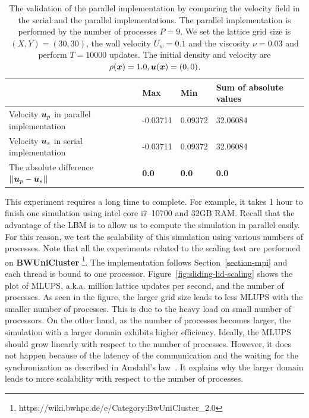 \begin{table}
  \begin{center}
    \caption{The validation of the parallel implementation by comparing
    the velocity field in the serial and the parallel implementations.
    The parallel implementation is performed by the number of processes $P = 9$.
    We set the lattice grid size is $(X, Y) = (30, 30)$,
    the wall velocity $U_w = 0.1$ and the viscosity $\nu = 0.03$
    and perform $T = 10000$ updates.
    The initial density and velocity are $\rho(\boldsymbol{x}) = 1.0, \boldsymbol{u}(\boldsymbol{x}) = (0, 0)$.
    }
    \vspace{2mm}
    \label{tab:parallel-validation}
    \begin{tabular}{llll}
      \toprule
       & Max & Min & Sum of absolute values \\
      \midrule
      Velocity $\boldsymbol{u}_p$ in parallel implementation & -0.03711 & 0.09372 & 32.06084 \\
      Velocity $\boldsymbol{u}_s$ in serial implementation & -0.03711 & 0.09372 & 32.06084 \\
      The absolute difference $|| \boldsymbol{u}_p - \boldsymbol{u}_s ||$ & {\bf 0.0} & {\bf 0.0} & {\bf 0.0} \\
      \bottomrule
    \end{tabular}
  \end{center}
  \vspace{-5mm}
\end{table}

This experiment requires a long time to complete.
For example, it takes 1 hour to finish one simulation using
intel core i7--10700 and 32GB RAM.
Recall that the advantage of the LBM is to allow us to compute the simulation in
parallel easily.
For this reason, we test the scalability of this simulation using
various numbers of processes.
Note that all the experiments related to the scaling test
are performed on {\bf BWUniCluster}
\footnote{https://wiki.bwhpc.de/e/Category:BwUniCluster\_2.0}.
The implementation follows Section~\ref{section-mpi}
and each thread is bound to one processor.
Figure~\ref{fig:sliding-lid-scaling} shows the plot of
MLUPS, a.k.a. million lattice updates per second, and
the number of processes.
As seen in the figure, the larger grid size leads to
less MLUPS with the smaller number of processes.
This is due to the heavy load on small number of processors.
On the other hand, as the number of processes
becomes larger, the simulation with a larger domain exhibits
higher efficiency.
Ideally, the MLUPS should grow linearly with respect to the number of processes.
However, it does not happen because of the latency of the communication
and the waiting for the synchronization as described in Amdahl's law~\cite{amdahl1967validity}.
It explains why the larger domain leads to more scalability with respect to
the number of processes.


